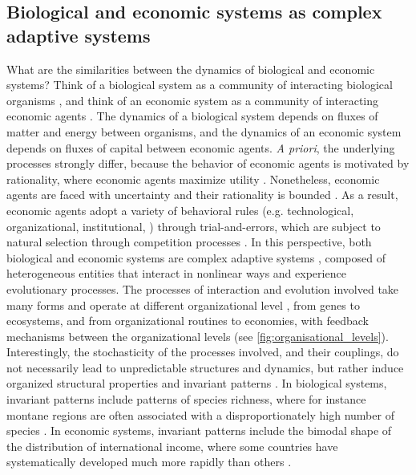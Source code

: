 \subsection{Biological and economic systems as complex adaptive systems}
What are the similarities between the dynamics of biological and economic systems? 
% 
Think of a biological system as a community of interacting biological organisms \citep{chapin2002principles}, and think of an economic system as a community of interacting economic agents \citep{Dopfer2007}.
% 
The dynamics of a biological system depends on fluxes of matter and energy between organisms, and the dynamics of an economic system depends on fluxes of capital between economic agents.
% 
\textit{A priori}, the underlying processes strongly differ, because the behavior of economic agents is motivated by rationality, where economic agents maximize utility \citep{10.1093/cje/bet027}. 
% 
Nonetheless, economic agents are faced with uncertainty \citep{Foster2012} and their rationality is bounded \citep{HerbertSimon}. As a result, economic agents adopt a variety of behavioral rules (e.g. technological, organizational, institutional, \cite{Foster2012}) through trial-and-errors, which are subject to natural selection through competition processes \citep{Schumpeter}.
% 
In this perspective, both biological and economic systems are complex adaptive systems \citep{Levin2002}, composed of heterogeneous entities that interact in nonlinear ways and experience evolutionary processes. 
% 
% 
The processes of interaction and evolution involved take many forms and operate at different organizational level \citep{Levin1998}, from genes to ecosystems, and from organizational routines to economies, with feedback mechanisms between the organizational levels (see \cref{fig:organisational_levels}).
% 
Interestingly, the stochasticity of the processes involved, and their couplings, do not necessarily lead to unpredictable structures and dynamics, but rather induce organized structural properties and invariant patterns \citep{Olff2009,mitchell2009complexity}. 
% 
In biological systems, invariant patterns include patterns of species richness, where for instance montane regions are often associated with a disproportionately high number of species \citep{Rahbek2019}. In economic systems, invariant patterns include the bimodal shape of the distribution of international income, where some countries have systematically developed much more rapidly than others \citep{acemoglu2001colonial}. 
